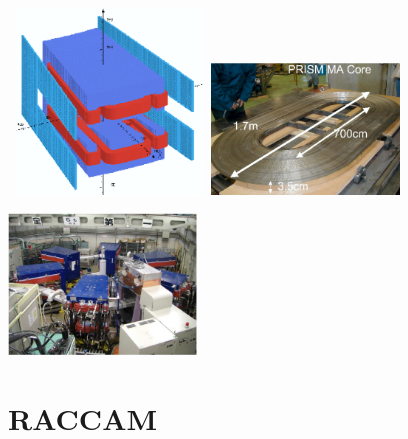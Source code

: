 \documentclass[12pt]{article}
\begin{document}
\begin{minipage}{1.\linewidth}
\begin{minipage}{.36\linewidth}
\begin{center}
\mbox{\hspace{-10mm}
\includegraphics[width=5.00cm]{./figs_FFAG_introSlides/prism_mag.eps}
\includegraphics[width=5.00cm]{./figs_FFAG_introSlides/prism_RFcore.eps}
}


\includegraphics[width=5.00cm]{./figs_FFAG_introSlides/prismRing.eps}

\end{center}

\end{minipage}
\end{minipage}





\clearpage 

\section{\LARGE RACCAM }
\end{document}
